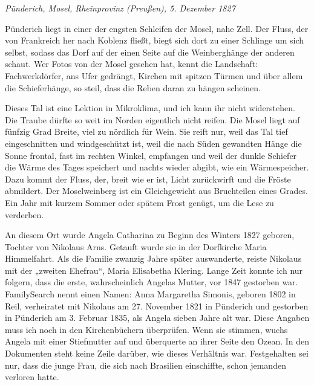 \documentclass[
  ngerman,
  11pt,
  openany]{book}
\begin{document}
\emph{Pünderich, Mosel, Rheinprovinz (Preußen), 5. Dezember 1827}

Pünderich liegt in einer der engsten Schleifen der Mosel, nahe Zell. Der
Fluss, der von Frankreich her nach Koblenz fließt, biegt sich dort zu
einer Schlinge um sich selbst, sodass das Dorf auf der einen Seite auf
die Weinberghänge der anderen schaut. Wer Fotos von der Mosel gesehen
hat, kennt die Landschaft: Fachwerkdörfer, ans Ufer gedrängt, Kirchen
mit spitzen Türmen und über allem die Schieferhänge, so steil, dass die
Reben daran zu hängen scheinen.

Dieses Tal ist eine Lektion in Mikroklima, und ich kann ihr nicht
widerstehen. Die Traube dürfte so weit im Norden eigentlich nicht
reifen. Die Mosel liegt auf fünfzig Grad Breite, viel zu nördlich für
Wein. Sie reift nur, weil das Tal tief eingeschnitten und windgeschützt
ist, weil die nach Süden gewandten Hänge die Sonne frontal, fast im
rechten Winkel, empfangen und weil der dunkle Schiefer die Wärme des
Tages speichert und nachts wieder abgibt, wie ein Wärmespeicher. Dazu
kommt der Fluss, der, breit wie er ist, Licht zurückwirft und die Fröste
abmildert. Der Moselweinberg ist ein Gleichgewicht aus Bruchteilen eines
Grades. Ein Jahr mit kurzem Sommer oder spätem Frost genügt, um die Lese
zu verderben.

An diesem Ort wurde Angela Catharina zu Beginn des Winters 1827 geboren,
Tochter von Nikolaus Arns. Getauft wurde sie in der Dorfkirche Maria
Himmelfahrt. Als die Familie zwanzig Jahre später auswanderte, reiste
Nikolaus mit der „zweiten Ehefrau``, Maria Elisabetha Klering. Lange
Zeit konnte ich nur folgern, dass die erste, wahrscheinlich Angelas
Mutter, vor 1847 gestorben war. FamilySearch nennt einen Namen: Anna
Margaretha Simonis, geboren 1802 in Reil, verheiratet mit Nikolaus am
27. November 1821 in Pünderich und gestorben in Pünderich am 3. Februar
1835, als Angela sieben Jahre alt war. Diese Angaben muss ich noch in
den Kirchenbüchern überprüfen. Wenn sie stimmen, wuchs Angela mit einer
Stiefmutter auf und überquerte an ihrer Seite den Ozean. In den
Dokumenten steht keine Zeile darüber, wie dieses Verhältnis war.
Festgehalten sei nur, dass die junge Frau, die sich nach Brasilien
einschiffte, schon jemanden verloren hatte.
\end{document}
